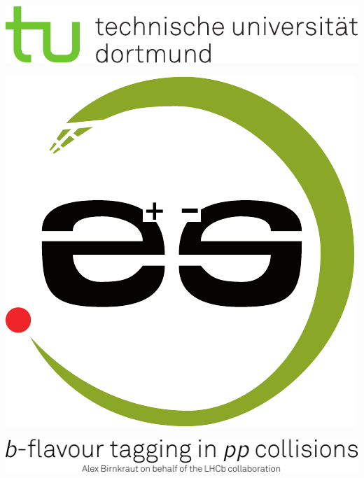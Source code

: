 \documentclass[a0poster,portrait,final,movebody=-5pt]{baposter}
\begin{document}
\begin{poster}
{\begin{minipage}[c]{0.20\textwidth}
\end{minipage}
\begin{minipage}[c]{0.20\textwidth}
\vspace{-1.6cm}\hspace{-2.5cm}
\includegraphics[height=0.3\textwidth]{figures/tud_logo_cmyk.pdf}
\end{minipage}
\begin{minipage}[c]{0.20\textwidth}
\vspace{-1.6cm}\hspace{3.3cm}
\includegraphics[height=0.3\textwidth]{figures/e5logo_green.pdf}
\end{minipage}
\newline
\begin{minipage}{0.8\textwidth}\vspace{2.5cm}\hspace{-19.8cm}
\includegraphics[height=0.077\textwidth]{figures/title2.pdf}
\end{minipage}
}
{}

{}


\end{poster}
\end{document}
